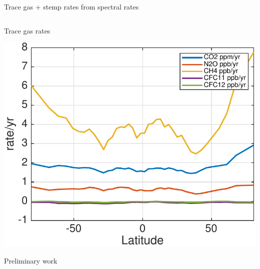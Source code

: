 \documentclass[10pt,t]{beamer}
\begin{document}
\begin{frame}{Trace gas + stemp rates from spectral rates}
\begin{columns}
\begin{column}{0.55\columnwidth}
\begin{block}{\footnotesize Trace gas rates}
\vspace{-0.1in}
\begin{center}
\includegraphics[width=\linewidth]{Figs/CloudAnom/Desc_ocean/tracegas_lat_rates_from_obs_specral_rates.pdf}
\end{center}
\footnotesize
Preliminary work
\end{block}
\end{column}
\end{columns}
\end{frame}


\end{document}
